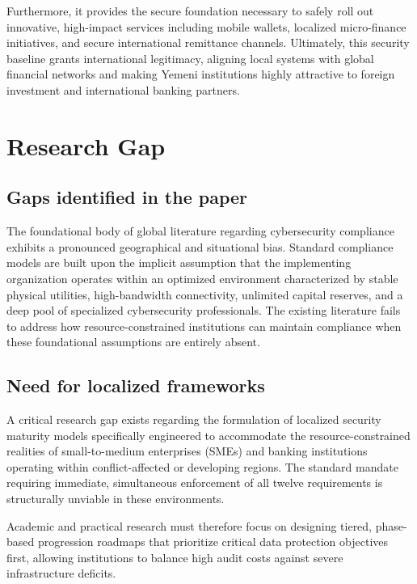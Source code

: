 \documentclass[12pt,a4paper,oneside]{report}
\begin{document}
	Furthermore, it provides the secure foundation necessary to safely roll out innovative, high-impact services including mobile wallets, localized micro-finance initiatives, and secure international remittance channels. Ultimately, this security baseline grants international legitimacy, aligning local systems with global financial networks and making Yemeni institutions highly attractive to foreign investment and international banking partners.
	
	\section{Research Gap}
	
	\subsection{Gaps identified in the paper}
	The foundational body of global literature regarding cybersecurity compliance exhibits a pronounced geographical and situational bias. Standard compliance models are built upon the implicit assumption that the implementing organization operates within an optimized environment characterized by stable physical utilities, high-bandwidth connectivity, unlimited capital reserves, and a deep pool of specialized cybersecurity professionals. The existing literature fails to address how resource-constrained institutions can maintain compliance when these foundational assumptions are entirely absent.
	
	\subsection{Need for localized frameworks}
	A critical research gap exists regarding the formulation of localized security maturity models specifically engineered to accommodate the resource-constrained realities of small-to-medium enterprises (SMEs) and banking institutions operating within conflict-affected or developing regions. The standard mandate requiring immediate, simultaneous enforcement of all twelve requirements is structurally unviable in these environments. 
	
	Academic and practical research must therefore focus on designing tiered, phase-based progression roadmaps that prioritize critical data protection objectives first, allowing institutions to balance high audit costs against severe infrastructure deficits.
	
\end{document}
